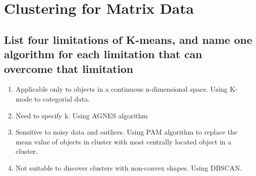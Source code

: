 \documentclass[11pt]{article} %
\begin{document}
\section{Clustering for Matrix Data}
\subsection{List four limitations of K-means, and name one algorithm for each limitation that can overcome that limitation}
\begin{enumerate}
\item Applicable only to objects in a continuous n-dimensional space. Using K-mode to categorial data.
\item Need to specify k. Using AGNES algorithm
\item Sensitive to noisy data and outliers. Using PAM algorithm to replace the mean value of objects in cluster with most centrally located object in a cluster.
\item Not suitable to discover clusters with non-convex shapes. Using DBSCAN.
\end{enumerate}
\end{document}
